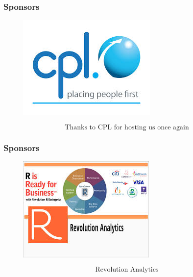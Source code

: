 \documentclass[PredictiveAnalytics101.tex]{subfiles}
\begin{document}
 
\begin{frame}
\frametitle{Sponsors}
\begin{figure}
\centering
\includegraphics[width=0.7\linewidth]{images/CPLlogo}
\end{figure}
\huge
\[ \mbox{Thanks to CPL for hosting us once again} \]


\end{frame}
\begin{frame}
\frametitle{Sponsors}
\begin{figure}
\centering
\includegraphics[width=0.7\linewidth]{images/revoR}
\end{figure}
\huge
\[ \mbox{Revolution Analytics} \]

\end{frame}
\end{document}
